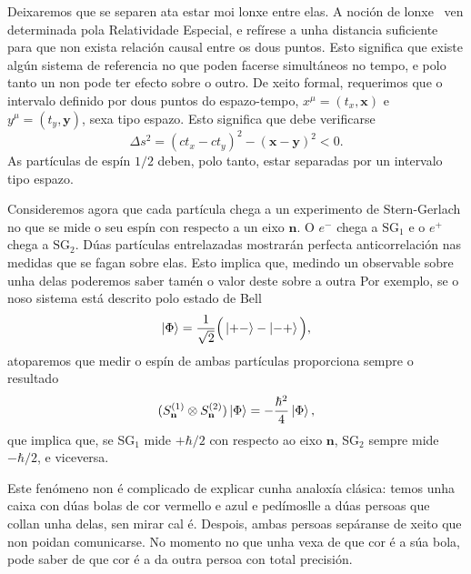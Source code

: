 \documentclass[a4paper,12pt]{article}
\begin{document}
Deixaremos que se separen ata estar moi lonxe entre elas. A noción de \guillemotleft lonxe\guillemotright ~ ven determinada pola Relatividade Especial, e refírese a unha distancia suficiente para que non exista relación causal entre os dous puntos.
Esto significa que existe algún sistema de referencia no que poden facerse simultáneos no tempo, e polo tanto un non pode ter efecto sobre o outro.
De xeito formal, requerimos que o intervalo definido por dous puntos do espazo-tempo, $x^\mu = (t_x,\textbf{x})$ e $y^\mu = (t_y, \textbf{y})$, sexa tipo espazo. Esto significa que debe verificarse
\begin{equation}
	\Delta s^2 = (ct_x - ct_y)^2 - (\textbf{x} - \textbf{y})^2 < 0.
\end{equation}
\noindent
As partículas de espín $1/2$ deben, polo tanto, estar separadas por un intervalo tipo espazo.

Consideremos agora que cada partícula chega a un experimento de Stern-Gerlach no que se mide o seu espín con respecto a un eixo $\textbf{n}$. O $e^-$ chega a $\mathrm{SG}_1$ e o $e^+$ chega a $\mathrm{SG}_2$.
Dúas partículas entrelazadas mostrarán perfecta anticorrelación nas medidas que se fagan sobre elas. Esto implica que, medindo un observable sobre unha delas poderemos saber tamén o valor deste sobre a outra
Por exemplo, se o noso sistema está descrito polo estado de Bell
\begin{equation}
	\ket{\Phi} = \frac{1}{\sqrt{2}} \Big ( \ket{+-} - \ket{-+} \Big ),
\end{equation}
\noindent
atoparemos que medir o espín de ambas partículas proporciona sempre o resultado
\begin{equation}
	(S_\textbf{n}^{(1)} \otimes S_\textbf{n}^{(2)}) \ket{\Phi} = -\frac{\hbar^2}{4}\ket{\Phi},
\end{equation}
\noindent
que implica que, se SG$_1$ mide $+\hbar/2$ con respecto ao eixo $\textbf{n}$, SG$_2$ sempre mide $-\hbar/2$, e viceversa.

Este fenómeno non é complicado de explicar cunha analoxía clásica: temos unha caixa con dúas bolas de cor vermello e azul e pedímoslle a dúas persoas que collan unha delas, sen mirar cal é. Despois, ambas persoas sepáranse de xeito que non poidan comunicarse. No momento no que unha vexa de que cor é a súa bola, pode saber de que cor é a da outra persoa con total precisión.
\end{document}
